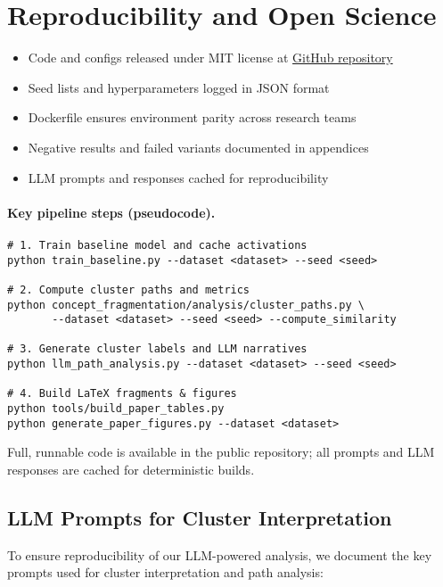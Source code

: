 \section{Reproducibility and Open Science}

\begin{itemize}
    \item Code and configs released under MIT license at \href{https://github.com/ConceptualFragmentationInLLMsAnalysisAndVisualization}{GitHub repository}
    \item Seed lists and hyperparameters logged in JSON format
    \item Dockerfile ensures environment parity across research teams
    \item Negative results and failed variants documented in appendices
    \item LLM prompts and responses cached for reproducibility
\end{itemize}

\paragraph{Key pipeline steps (pseudocode).}

\begin{verbatim}
# 1. Train baseline model and cache activations
python train_baseline.py --dataset <dataset> --seed <seed>

# 2. Compute cluster paths and metrics
python concept_fragmentation/analysis/cluster_paths.py \
       --dataset <dataset> --seed <seed> --compute_similarity

# 3. Generate cluster labels and LLM narratives
python llm_path_analysis.py --dataset <dataset> --seed <seed>

# 4. Build LaTeX fragments & figures
python tools/build_paper_tables.py
python generate_paper_figures.py --dataset <dataset>
\end{verbatim}

Full, runnable code is available in the public repository; all prompts and
LLM responses are cached for deterministic builds.

\subsection{LLM Prompts for Cluster Interpretation}

To ensure reproducibility of our LLM-powered analysis, we document the key prompts used for cluster interpretation and path analysis:

